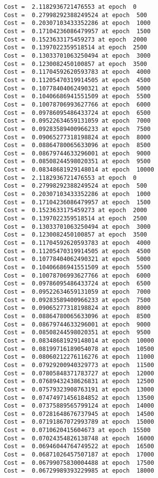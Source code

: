\documentclass[11pt]{article}
\begin{document}
    \begin{Verbatim}[commandchars=\\\{\}]
Cost =  2.1182936721476553 at epoch  0
Cost =  0.27998292388249524 at epoch  500
Cost =  0.20307103433352286 at epoch  1000
Cost =  0.17104236086479957 at epoch  1500
Cost =  0.1523633175459273 at epoch  2000
Cost =  0.1397022359518514 at epoch  2500
Cost =  0.13033701063250494 at epoch  3000
Cost =  0.1230082450100857 at epoch  3500
Cost =  0.11704592620593783 at epoch  4000
Cost =  0.11205470319914505 at epoch  4500
Cost =  0.10778404062490321 at epoch  5000
Cost =  0.10406686941551509 at epoch  5500
Cost =  0.10078706993627766 at epoch  6000
Cost =  0.09786095486433724 at epoch  6500
Cost =  0.09522634659131059 at epoch  7000
Cost =  0.09283589400966233 at epoch  7500
Cost =  0.09065277318198824 at epoch  8000
Cost =  0.08864780065633096 at epoch  8500
Cost =  0.08679744633296001 at epoch  9000
Cost =  0.08508244598020351 at epoch  9500
Cost =  0.08348681929148014 at epoch  10000
Cost =  2.1182936721476553 at epoch  0
Cost =  0.27998292388249524 at epoch  500
Cost =  0.20307103433352286 at epoch  1000
Cost =  0.17104236086479957 at epoch  1500
Cost =  0.1523633175459273 at epoch  2000
Cost =  0.1397022359518514 at epoch  2500
Cost =  0.13033701063250494 at epoch  3000
Cost =  0.1230082450100857 at epoch  3500
Cost =  0.11704592620593783 at epoch  4000
Cost =  0.11205470319914505 at epoch  4500
Cost =  0.10778404062490321 at epoch  5000
Cost =  0.10406686941551509 at epoch  5500
Cost =  0.10078706993627766 at epoch  6000
Cost =  0.09786095486433724 at epoch  6500
Cost =  0.09522634659131059 at epoch  7000
Cost =  0.09283589400966233 at epoch  7500
Cost =  0.09065277318198824 at epoch  8000
Cost =  0.08864780065633096 at epoch  8500
Cost =  0.08679744633296001 at epoch  9000
Cost =  0.08508244598020351 at epoch  9500
Cost =  0.08348681929148014 at epoch  10000
Cost =  0.08199716189054078 at epoch  10500
Cost =  0.08060212276116276 at epoch  11000
Cost =  0.07929200940329773 at epoch  11500
Cost =  0.07805848371783727 at epoch  12000
Cost =  0.07689432438626831 at epoch  12500
Cost =  0.07579323908763191 at epoch  13000
Cost =  0.07474971456184852 at epoch  13500
Cost =  0.07375889565799124 at epoch  14000
Cost =  0.07281648676737945 at epoch  14500
Cost =  0.07191867072993789 at epoch  15000
Cost =  0.0710620415604673 at epoch  15500
Cost =  0.07024354826138748 at epoch  16000
Cost =  0.06946044764749522 at epoch  16500
Cost =  0.06871026457507187 at epoch  17000
Cost =  0.06799075830004488 at epoch  17500
Cost =  0.06729989393229985 at epoch  18000

\end{Verbatim}
\end{document}
